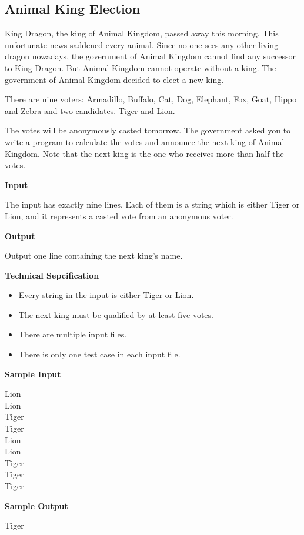 \subsection{Animal King Election}
King Dragon, the king of Animal Kingdom, passed away this morning. This unfortunate news saddened every animal. Since no one sees any other living dragon nowadays, the government of Animal Kingdom cannot find any successor to King Dragon. But Animal Kingdom cannot operate without a king. The government of Animal Kingdom decided to elect a new king.

There are nine voters: Armadillo, Buffalo, Cat, Dog, Elephant, Fox, Goat, Hippo and Zebra and two candidates. Tiger and Lion.

The votes will be anonymously casted tomorrow. The government asked you to write a program to calculate the votes and announce the next king of Animal Kingdom. Note that the next king is the one who receives more than half the votes.

\begin{flushleft}
{\color{red} \textbf{Input}}
\end{flushleft}
The input has exactly nine lines. Each of them is a string which is either Tiger or Lion, and it represents a casted vote from an anonymous voter.

\begin{flushleft}
{\color{red} \textbf{Output}}
\end{flushleft}
Output one line containing the next king's name.

\begin{flushleft}
{\color{red} \textbf{Technical Sepcification}}
\end{flushleft}
\begin{itemize}
\item Every string in the input is either Tiger or Lion.
\item The next king must be qualified by at least five votes.
\item There are multiple input files.
\item There is only one test case in each input file.
\end{itemize}

\begin{flushleft}
{\color{red} \textbf{Sample Input}}
\end{flushleft}
\begin{flushleft}
Lion\\
Lion\\
Tiger\\
Tiger\\
Lion\\
Lion\\
Tiger\\
Tiger\\
Tiger\\
\end{flushleft}

\begin{flushleft}
{\color{red} \textbf{Sample Output}}
\end{flushleft}
\begin{flushleft}
Tiger\\
\end{flushleft}

\newpage
